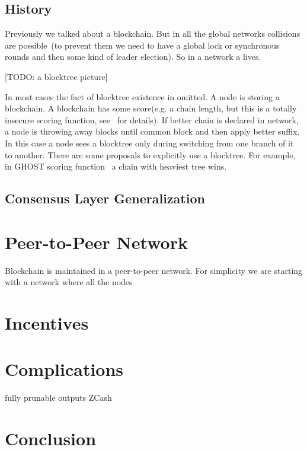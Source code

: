 \documentclass[]{report}   %
\begin{document}
\subsection{History}

Previously we talked about a blockchain. But in all the global networks collisions are possible~(to prevent them we need to have a global lock or synchronous rounds and then some kind of leader election). So in a network a  lives.

[TODO: a blocktree picture]

In most cases the fact of blocktree existence in omitted. A node is storing a blockchain. A blockchain has some score(e.g. a chain length, but this is a totally insecure scoring function, see~\cite{?} for details). If better chain is declared in network, a node is throwing away blocks until common block and then apply better suffix. In this case a node sees a blocktree only during switching from one branch of it to another. There are some proposals to explicitly use a blocktree. For example, in GHOST scoring function~\cite{} a chain with heaviest tree wins. 


\subsection{Consensus Layer Generalization}

\section{Peer-to-Peer Network}	

Blockchain is maintained in a peer-to-peer network. For simplicity we are starting with a network where all the nodes 

\section{Incentives}



\section{Complications}

fully prunable outputs 
ZCash

\section{Conclusion}
\end{document}
